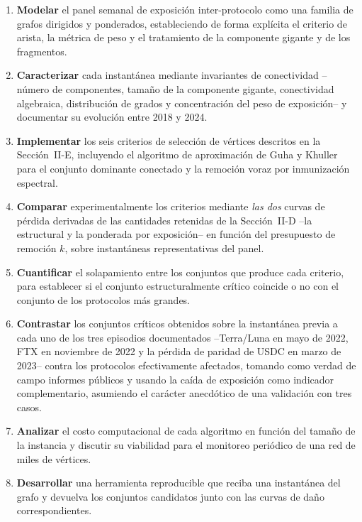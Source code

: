 \documentclass[journal]{IEEEtran}
\begin{document}
\begin{enumerate}
\item \textbf{Modelar} el panel semanal de exposición inter-protocolo como una
      familia de grafos dirigidos y ponderados, estableciendo de forma explícita
      el criterio de arista, la métrica de peso y el tratamiento de la
      componente gigante y de los fragmentos.

\item \textbf{Caracterizar} cada instantánea mediante invariantes de conectividad
      --número de componentes, tamaño de la componente gigante, conectividad
      algebraica, distribución de grados y concentración del peso de exposición--
      y documentar su evolución entre 2018 y 2024.

\item \textbf{Implementar} los seis criterios de selección de vértices descritos
      en la Sección~II-E, incluyendo el algoritmo de aproximación de Guha y
      Khuller para el conjunto dominante conectado y la remoción voraz por
      inmunización espectral.

\item \textbf{Comparar} experimentalmente los criterios mediante \emph{las dos}
      curvas de pérdida derivadas de las cantidades retenidas de la
      Sección~II-D --la estructural y la ponderada por exposición-- en
      función del presupuesto de remoción $k$, sobre instantáneas representativas
      del panel.

\item \textbf{Cuantificar} el solapamiento entre los conjuntos que produce cada
      criterio, para establecer si el conjunto estructuralmente crítico coincide
      o no con el conjunto de los protocolos más grandes.

\item \textbf{Contrastar} los conjuntos críticos obtenidos sobre la instantánea
      previa a cada uno de los tres episodios documentados --Terra/Luna en mayo de
      2022, FTX en noviembre de 2022 y la pérdida de paridad de USDC en marzo de
      2023-- contra los protocolos efectivamente afectados, tomando como verdad de
      campo informes públicos y usando la caída de exposición como indicador
      complementario, asumiendo el carácter
      anecdótico de una validación con tres casos.

\item \textbf{Analizar} el costo computacional de cada algoritmo en función del
      tamaño de la instancia y discutir su viabilidad para el monitoreo periódico
      de una red de miles de vértices.

\item \textbf{Desarrollar} una herramienta reproducible que reciba una
      instantánea del grafo y devuelva los conjuntos candidatos junto con las
      curvas de daño correspondientes.
\end{enumerate}
\end{document}
